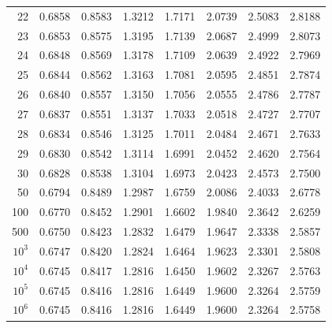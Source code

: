 \begin{minipage}{18cm}
\begin{tabular}{|r|rrrrrrr|}
22&0.6858&0.8583&1.3212&1.7171&2.0739&2.5083&2.8188\\
23&0.6853&0.8575&1.3195&1.7139&2.0687&2.4999&2.8073\\
24&0.6848&0.8569&1.3178&1.7109&2.0639&2.4922&2.7969\\
25&0.6844&0.8562&1.3163&1.7081&2.0595&2.4851&2.7874\\
26&0.6840&0.8557&1.3150&1.7056&2.0555&2.4786&2.7787\\
27&0.6837&0.8551&1.3137&1.7033&2.0518&2.4727&2.7707\\
28&0.6834&0.8546&1.3125&1.7011&2.0484&2.4671&2.7633\\
29&0.6830&0.8542&1.3114&1.6991&2.0452&2.4620&2.7564\\
30&0.6828&0.8538&1.3104&1.6973&2.0423&2.4573&2.7500\\
50&0.6794&0.8489&1.2987&1.6759&2.0086&2.4033&2.6778\\
100&0.6770&0.8452&1.2901&1.6602&1.9840&2.3642&2.6259\\
500&0.6750&0.8423&1.2832&1.6479&1.9647&2.3338&2.5857\\
$10^3$&0.6747&0.8420&1.2824&1.6464&1.9623&2.3301&2.5808\\
$10^4$&0.6745&0.8417&1.2816&1.6450&1.9602&2.3267&2.5763\\
$10^5$&0.6745&0.8416&1.2816&1.6449&1.9600&2.3264&2.5759\\
$10^6$&0.6745&0.8416&1.2816&1.6449&1.9600&2.3264&2.5758\\
\hline
\end{tabular}
    \end{minipage}


